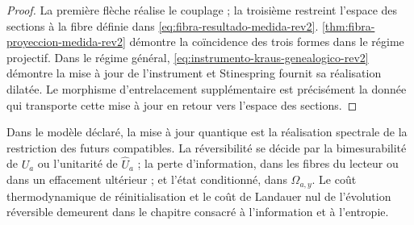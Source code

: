 \begin{proof}
La première flèche réalise le couplage ; la troisième restreint l’espace des sections à la fibre définie dans \eqref{eq:fibra-resultado-medida-rev2}. \cref{thm:fibra-proyeccion-medida-rev2} démontre la coïncidence des trois formes dans le régime projectif. Dans le régime général, \eqref{eq:instrumento-kraus-genealogico-rev2} démontre la mise à jour de l’instrument et Stinespring fournit sa réalisation dilatée. Le morphisme d’entrelacement supplémentaire est précisément la donnée qui transporte cette mise à jour en retour vers l’espace des sections.
\end{proof}

\begin{statusbox}[title={Résultat et localisation}]
Dans le modèle déclaré, la mise à jour quantique est la réalisation spectrale de la restriction des futurs compatibles. La réversibilité se décide par la bimesurabilité de \(U_a\) ou l’unitarité de \(\widehat U_a\) ; la perte d’information, dans les fibres du lecteur ou dans un effacement ultérieur ; et l’état conditionné, dans \(\Omega_{a,y}\). Le coût thermodynamique de réinitialisation et le coût de Landauer nul de l’évolution réversible demeurent dans le chapitre consacré à l’information et à l’entropie.
\end{statusbox}
